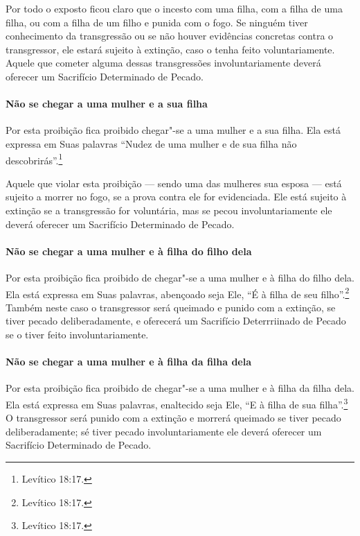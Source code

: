 \begin{multicols}{2}
Por todo o exposto ficou claro que o incesto com uma filha, com a filha de uma filha, ou com a filha de um filho e punida com o fogo. Se
ninguém tiver conhecimento da transgressão ou se não houver evidências
concretas contra o transgressor, ele estará sujeito à extinção, caso o
tenha feito voluntariamente. Aquele que cometer alguma dessas
transgressões involuntariamente deverá oferecer um Sacrifício
Determinado de Pecado.

\paragraph{Não se chegar a uma mulher e a sua filha}

Por esta proibição fica proibido chegar"-se a uma mulher e a sua filha.
Ela está expressa em Suas palavras ``Nudez de uma mulher e de sua filha
não descobrirás''.\footnote{Levítico 18:17.}

Aquele que violar esta proibição --- sendo uma das mulheres sua esposa
--- está sujeito a morrer no fogo, se a prova contra ele for
evidenciada. Ele está sujeito à extinção se a transgressão for
voluntária, mas se pecou involuntariamente ele deverá oferecer um
Sacrifício Determinado de Pecado.

\paragraph{Não se chegar a uma mulher e à filha do filho dela}

Por esta proibição fica proibido de chegar"-se a uma mulher e à filha do
filho dela. Ela está expressa em Suas palavras, abençoado seja Ele, ``É à
filha de seu filho''.\footnote{Levítico 18:17.} Também neste caso o transgressor
será queimado e punido com a extinção, se tiver pecado deliberadamente,
e oferecerá um Sacrifício Deterrriinado de Pecado se o tiver feito
involuntariamente.

\paragraph{Não se chegar a uma mulher e à filha da filha dela}

Por esta proibição fica proibido de chegar"-se a uma mulher e à filha da
filha dela. Ela está expressa em Suas palavras, enaltecido seja Ele, ``E
à filha de sua filha''.\footnote{Levítico 18:17.} O transgressor será punido com
a extinção e morrerá queimado se tiver pecado deliberadamente; sé tiver
pecado involuntariamente ele deverá oferecer um Sacrifício Determinado
de Pecado.


\end{multicols}
